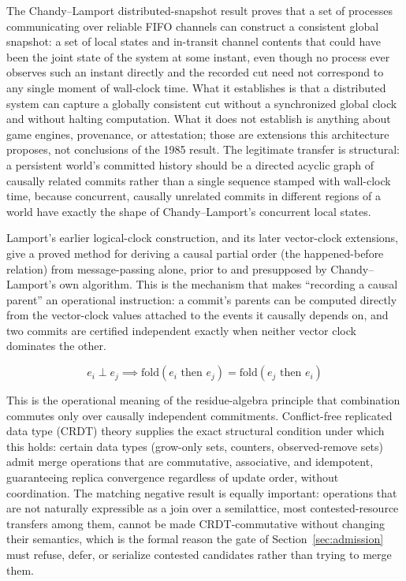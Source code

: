 \documentclass[11pt]{article}
\begin{document}
The Chandy--Lamport distributed-snapshot result proves that a set of processes communicating over reliable FIFO channels can construct a consistent global snapshot: a set of local states and in-transit channel contents that could have been the joint state of the system at some instant, even though no process ever observes such an instant directly and the recorded cut need not correspond to any single moment of wall-clock time. What it establishes is that a distributed system can capture a globally consistent cut without a synchronized global clock and without halting computation. What it does not establish is anything about game engines, provenance, or attestation; those are extensions this architecture proposes, not conclusions of the 1985 result. The legitimate transfer is structural: a persistent world's committed history should be a directed acyclic graph of causally related commits rather than a single sequence stamped with wall-clock time, because concurrent, causally unrelated commits in different regions of a world have exactly the shape of Chandy--Lamport's concurrent local states.

Lamport's earlier logical-clock construction, and its later vector-clock extensions, give a proved method for deriving a causal partial order (the happened-before relation) from message-passing alone, prior to and presupposed by Chandy--Lamport's own algorithm. This is the mechanism that makes ``recording a causal parent'' an operational instruction: a commit's parents can be computed directly from the vector-clock values attached to the events it causally depends on, and two commits are certified independent exactly when neither vector clock dominates the other.

\[
e_i \perp e_j \implies \mathrm{fold}(e_i \text{ then } e_j) = \mathrm{fold}(e_j \text{ then } e_i)
\]

This is the operational meaning of the residue-algebra principle that combination commutes only over causally independent commitments. Conflict-free replicated data type (CRDT) theory supplies the exact structural condition under which this holds: certain data types (grow-only sets, counters, observed-remove sets) admit merge operations that are commutative, associative, and idempotent, guaranteeing replica convergence regardless of update order, without coordination. The matching negative result is equally important: operations that are not naturally expressible as a join over a semilattice, most contested-resource transfers among them, cannot be made CRDT-commutative without changing their semantics, which is the formal reason the gate of Section~\ref{sec:admission} must refuse, defer, or serialize contested candidates rather than trying to merge them.
\end{document}
